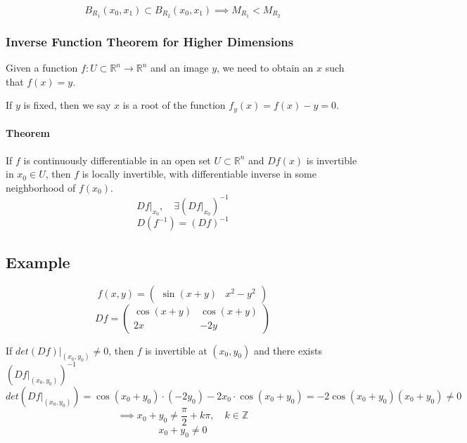 \documentclass[11pt]{article}
\begin{document}
\[
B_{R_1}(x_0,x_1) \subset B_{R_2}(x_0,x_1) \implies M_{R_1} < M_{R_2}
\]

\subsubsection{Inverse Function Theorem for Higher Dimensions}
Given a function $f : U \subset \mathbb{R}^n \rightarrow \mathbb{R}^n$ and an image $y$, we need to obtain an $x$ such that $f(x) = y$.

If $y$ is fixed, then we say $x$ is a root of the function $f_y(x) = f(x) - y = 0$.

\paragraph{Theorem}
If $f$ is continuously differentiable in an open set $U \subset \mathbb{R}^n$ and $Df(x)$ is invertible in $x_0 \in U$, then $f$ is locally invertible, with differentiable inverse in some neighborhood of $f(x_0)$.
\[
Df \big|_{x_0}, \quad \exists (Df \big|_{x_0})^{-1}
\]
\[
D(f^{-1}) = (Df)^{-1}
\]

\subsection*{Example}
\[
f(x,y) = \begin{pmatrix}
    \sin (x + y) & x^2 - y^2
\end{pmatrix}
\]
\[
Df = \begin{pmatrix}
    \cos (x + y) & \cos (x + y) \\
    2x & -2y
\end{pmatrix}
\]

If $det(Df)\big|_{(x_0,y_0)} \neq 0$, then $f$ is invertible at $(x_0,y_0)$ and there exists $(Df \big|_{(x_0,y_0)})^{-1}$
\[
det(Df \big|_{(x_0,y_0)}) = \cos (x_0 + y_0) \cdot (-2y_0) - 2x_0 \cdot \cos (x_0 + y_0) = -2 \cos (x_0 + y_0) (x_0 + y_0) \neq 0
\]
\[
\implies x_0 + y_0 \neq \frac{\pi}{2} + k \pi, \quad k \in \mathbb{Z}
\]
\[
x_0 + y_0 \neq 0
\]
\end{document}
